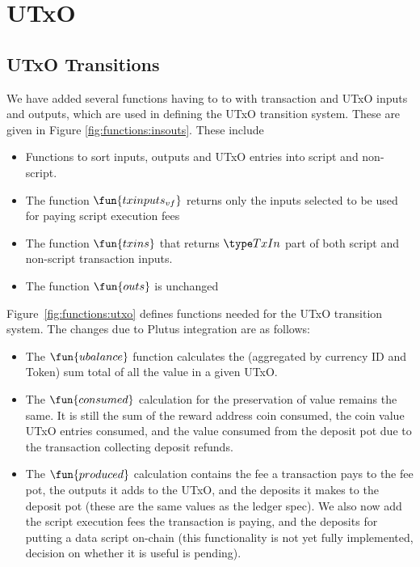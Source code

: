 \section{UTxO}
\label{sec:utxo}


\subsection{UTxO Transitions}
\label{sec:utxo-trans}

We have added several functions having to to with transaction and UTxO inputs and
outputs, which are used in defining the UTxO transition system. These are
given in Figure \ref{fig:functions:insouts}. These include

\begin{itemize}
  \item Functions to
sort inputs, outputs and UTxO entries into script and non-script.

  \item The function $\fun{txinputs_{vf}}$ returns only the inputs selected to be used
for paying script execution fees
  \item The function $\fun{txins}$ that returns $\TxIn$ part of both script
  and non-script transaction inputs.
  \item The function $\fun{outs}$ is unchanged
\end{itemize}

Figure~\ref{fig:functions:utxo} defines functions needed for the UTxO transition system.
The changes due to Plutus integration are as follows:

\begin{itemize}

  \item
    The $\fun{ubalance}$ function calculates the (aggregated by currency ID and
    Token) sum total of all the value in a given UTxO.

  \item The $\fun{consumed}$ calculation for the preservation of value remains the
  same. It is still the sum of the reward address coin consumed, the coin value
   UTxO entries consumed, and the value consumed from the deposit pot due
   to the transaction collecting deposit refunds.

  \item The $\fun{produced}$ calculation contains the fee a transaction pays
  to the fee pot, the outputs it adds to the UTxO, and the deposits it makes
  to the deposit pot (these are the same values as the ledger spec). We also
  now add the script execution fees the transaction is paying, and the deposits
  for putting a data script on-chain (this functionality is not yet fully
  implemented, decision on whether it is useful is pending).
\end{itemize}


